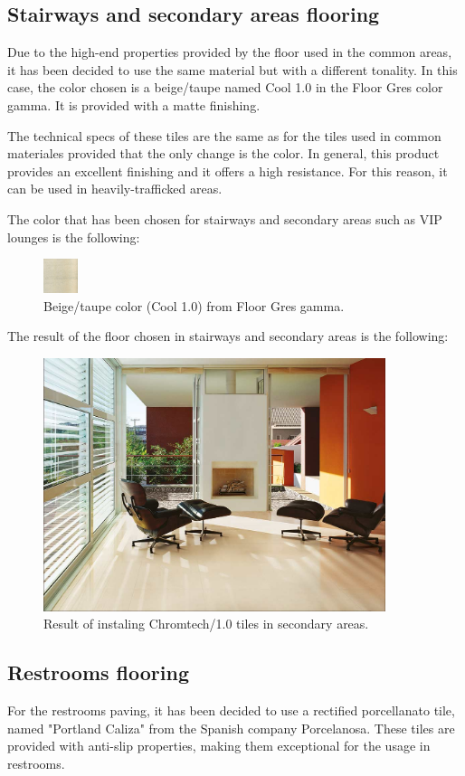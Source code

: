 		\subsection{Stairways and secondary areas flooring}
	Due to the high-end properties provided by the floor used in the common areas, it has been decided to use the same material but with a different tonality. In this case, the color chosen is  a beige/taupe named Cool 1.0 in the Floor Gres color gamma. It is provided with a matte finishing.
	
	The technical specs of these tiles are the same as for the tiles used in common materiales provided that the only change is the color. In general, this product provides an excellent finishing and it offers a high resistance. For this reason, it can be used in heavily-trafficked areas.
	
	The color that has been chosen for stairways and secondary areas such as VIP lounges is the following:
		\begin{figure}[H]
	\centering
\includegraphics[width=1cm]{./images/Color2}
\caption{Beige/taupe color (Cool 1.0) from Floor Gres gamma.}
\end{figure}

The result of the floor chosen in stairways and secondary areas is the following:
\begin{figure}[H]
	\centering
\includegraphics[width=10cm]{./images/Resultado2}
\caption{Result of instaling Chromtech/1.0 tiles in secondary areas.}
\end{figure}
		\subsection{Restrooms flooring}
	For the restrooms paving, it has been decided to use a rectified porcellanato tile, named "Portland Caliza" from the Spanish company Porcelanosa. These tiles are provided with anti-slip properties, making them exceptional for the usage in restrooms.
	
